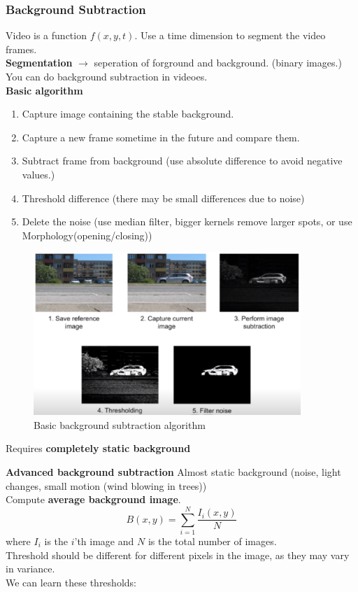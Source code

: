 \documentclass[a4paper]{article}
\begin{document}
\subsubsection{Background Subtraction}
Video is a function $ f(x,y,t) $. Use a time dimension to segment the video frames. \\
\textbf{Segmentation} $ \rightarrow $  seperation of forground and background. (binary images.)
You can do background subtraction in videoes. \\
\textbf{Basic algorithm} 
\begin{enumerate}
	\item Capture image containing the stable background.
	\item Capture a new frame sometime in the future and compare them.
	\item Subtract frame from background (use absolute difference to avoid negative values.)
	\item Threshold difference (there may be small differences due to noise)
	\item Delete the noise (use median filter, bigger kernels remove larger spots, or use Morphology(opening/closing))
\end{enumerate}
\begin{figure}[H]
\centering
\includegraphics[width=0.9\textwidth]{figures/Background_subtraction_basic.png}
\caption{Basic background subtraction algorithm}
\label{fig:basic_background_subtraction}
\end{figure} 

Requires \textbf{completely static background} 


\textbf{Advanced background subtraction} 
Almost static background (noise, light changes, small motion (wind blowing in trees))\\
Compute \textbf{average background image}.
\begin{equation}
B(x,y) = \sum_{i=1}^{N}{\frac{I_i(x,y)}{N} }
\end{equation}
where $ I_i $ is the $ i $'th image and $ N $ is the total number of images. \\
Threshold should be different for different pixels in the image, as they may vary in variance. \\
We can learn these thresholds:
\end{document}
